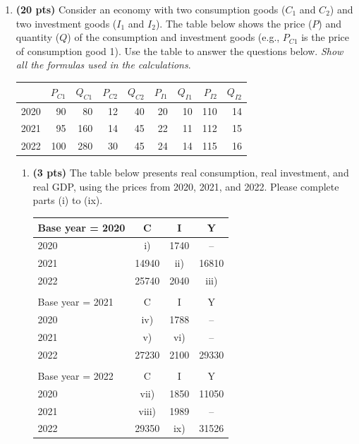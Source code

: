 \documentclass[14pt, oneside]{memoir}
\begin{document}
\begin{enumerate}[label=\textbf{\arabic*.}, itemsep=15pt]

\item \textbf{(20  pts)}\label{P1} Consider an economy with two consumption goods (\(C_1\) and \(C_2\)) and two investment goods (\(I_1\) and \(I_2\)). The table below shows the price (\(P\)) and quantity (\(Q\)) of the consumption and investment goods (e.g., $P_{C1}$ is the price of consumption good 1). Use the table to answer the questions below. \textit{Show all the formulas used in the calculations}.

\begin{table}[htbp]
	\centering
	
	\begin{tabular}{rrrrrrrrr}
		& $P_{C1}$ & $Q_{C1}$ & $P_{C2}$ & $Q_{C2}$ & $P_{I1}$ & $Q_{I1}$ & $P_{I2}$ & $Q_{I2}$ \\ \hline
		2020  & 90     & 80    & 12    & 40    & 20    & 10    & 110   & 14 \\
		2021  & 95     & 160   & 14    & 45    & 22    & 11    & 112   & 15 \\
		2022  & 100    & 280   & 30    & 45    & 24    & 14    & 115   & 16 \\ \hline
	\end{tabular}%
\end{table}%

\begin{enumerate}[label=(\alph*)]
	\item \textbf{(3  pts)}  The table below presents real consumption, real investment, and real GDP, using the prices from 2020, 2021, and 2022. Please complete parts (i) to (ix).
	
	\begin{table}[htbp]
		\centering
		\begin{tabular}{lccc}
			Base year = 2020 & C     & I     & Y \\ \hline
			2020  & i)  & 1740  & -- \\
			2021  & 14940 & ii)  & 16810 \\
			2022  & 25740 & 2040  & iii) \\ \hline
			&       &       &  \\
			Base year = 2021 & C     & I     & Y \\ \hline
			2020  & iv)  & 1788  & -- \\
			2021  & v) & vi)  & -- \\
			2022  & 27230 & 2100  & 29330 \\ \hline
			&       &       &  \\
			Base year = 2022 & C     & I     & Y \\ \hline
			2020  & vii)  & 1850  & 11050 \\
			2021  & viii) & 1989  & -- \\
			2022  & 29350 & ix)  & 31526 \\ \hline
		\end{tabular}%
	\end{table}%
	\clearpage
	

\end{enumerate}
\end{enumerate}
\end{document}
